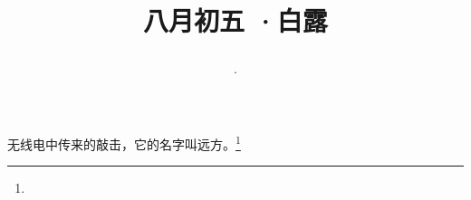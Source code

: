 \title{\date[d=7,m=9,y=2024][year:cn-y,年,month:cn,day:cn,日,·,weekday]·八月初五 ·白露}
无线电中传来的敲击，它的名字叫远方。\footnote{ }

